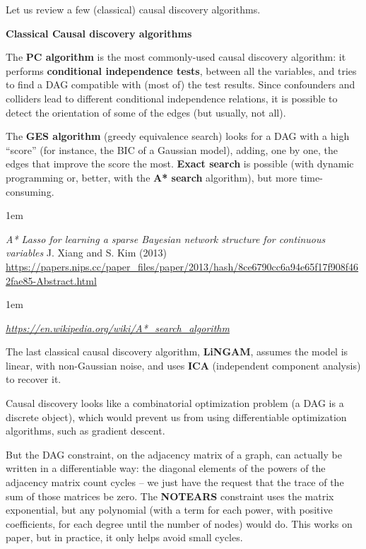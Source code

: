 \documentclass[a5paper]{article}
\let\d\textbf
\newenvironment{reference}{%
  \medskip\goodbreak
  \parskip 0pt
  \raggedright
  \leftskip 1em
  \obeylines
}{\par\medskip\goodbreak}
\def\subsection#1{{\par\bigskip\goodbreak\large\bfseries #1\par}}
\begin{document}
Let us review a few (classical) causal discovery algorithms. 

\subsection{Classical Causal discovery algorithms}

The \d{PC algorithm} is the most commonly-used causal discovery algorithm:
it performs \d{conditional independence tests}, between all the variables,
and tries to find a DAG compatible with (most of) the test results.
Since confounders and colliders lead to different conditional independence relations,
it is possible to detect the orientation of some of the edges (but usually, not all).

The \d{GES algorithm} (greedy equivalence search) looks for a DAG with a high ``score''
(for instance, the BIC of a Gaussian model), adding, one by one,
the edges that improve the score the most.
\d{Exact search} is possible (with dynamic programming or, better, with the \d{A* search} algorithm),
but more time-consuming.

\begin{reference}
  \emph{A* Lasso for learning a sparse Bayesian network structure for continuous variables}
  J. Xiang and S. Kim (2013)
  \url{https://papers.nips.cc/paper_files/paper/2013/hash/8ce6790cc6a94e65f17f908f462fae85-Abstract.html}
\end{reference}

\begin{reference}
  \emph{\url{https://en.wikipedia.org/wiki/A*_search_algorithm}}
\end{reference}

The last classical causal discovery algorithm, \d{LiNGAM}, assumes the model is linear,
with non-Gaussian noise, and uses \d{ICA} (independent component analysis) to recover it.

Causal discovery looks like a combinatorial optimization problem (a DAG is a discrete object),
which would prevent us from using differentiable optimization algorithms, such as gradient descent.

But the DAG constraint, on the adjacency matrix of a graph, can actually be written in a differentiable way:
the diagonal elements of the powers of the adjacency matrix
count cycles -- we just have the request that the trace of the sum of those matrices be zero.
The \d{NOTEARS} constraint uses the matrix exponential, but any polynomial
(with a term for each power, with positive coefficients,
for each degree until the number of nodes) would do.
This works on paper, but in practice, it only helps avoid small cycles.
\end{document}
